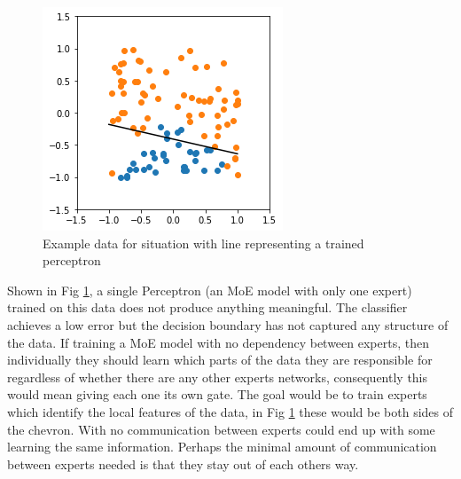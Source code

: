 \documentclass[notitlepage]{report}
\theoremstyle{definition}
\begin{document}
\begin{figure}[H]
	\centering
	\begin{minipage}[b]{0.5\textwidth}
		\includegraphics[width=\textwidth]{Standard-Perceptron.png}
		\caption{Example data for situation with line representing a trained perceptron}
		\label{fig:intro-concrete-example}
	\end{minipage}
	\hfill
\end{figure}

Shown in Fig \ref{fig:intro-concrete-example}, a single Perceptron (an MoE model with only one expert) trained on this data does not produce anything meaningful. The classifier achieves a low error but the decision boundary has not captured any structure of the data. If training a MoE model with no dependency between experts, then individually they should learn which parts of the data they are responsible for regardless of whether there are any other experts networks, consequently this would mean giving each one its own gate. The goal would be to train experts which identify the local features of the data, in Fig \ref{fig:intro-concrete-example} these would be both sides of the chevron. With no communication between experts could end up with some learning the same information. Perhaps the minimal amount of communication between experts needed is that they stay out of each others way.\\
\end{document}
